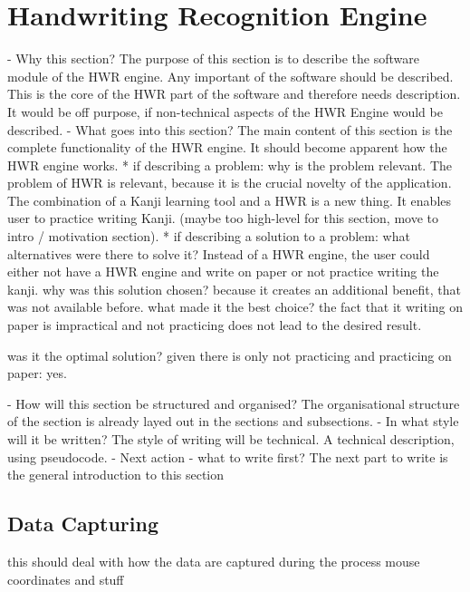 
\chapter{Handwriting Recognition Engine}
\label{chap:handwritingrecognitionengine}

- Why this section? 
  The purpose of this section is to describe the software module of the 
  HWR engine.
  Any important of the software should be described. This is the core of the
  HWR part of the software and therefore needs description.
  It would be off purpose, if non-technical aspects of the HWR Engine would be 
  described.
- What goes into this section?
  The main content of this section is the complete functionality of the 
  HWR engine.
  It should become apparent how the HWR engine works.
  * if describing a problem: why is the problem relevant.
    The problem of HWR is relevant, because it is the crucial novelty of the
    application. The combination of a Kanji learning tool and a HWR is a new 
    thing. It enables user to practice writing Kanji. (maybe too high-level for
    this section, move to intro / motivation section).
  * if describing a solution to a problem: 
    what alternatives were there to solve it?    
    Instead of a HWR engine, the user could either not have a HWR engine and
    write on paper or not practice writing the kanji.
    why was this solution chosen? 
    because it creates an additional benefit, that was not available before.
    what made it the best choice? 
    the fact that it writing on paper is impractical and not practicing does
    not lead to the desired result.

    was it the optimal solution? given there is only not practicing and
    practicing on paper: yes.

- How will this section be structured and organised?
  The organisational structure of the section is already layed out in the
  sections and subsections.
- In what style will it be written?
  The style of writing will be technical. A technical description, using
  pseudocode.
- Next action - what to write first?
  The next part to write is the general introduction to this section


\section{Data Capturing}
\label{sec:hwre:datacapturing}
this should deal with how the data are captured during the process
mouse coordinates and stuff

